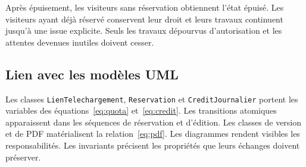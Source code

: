 Après épuisement, les visiteurs sans réservation obtiennent l'état épuisé. Les visiteurs ayant déjà réservé conservent leur droit et leurs travaux continuent jusqu'à une issue explicite. Seuls les travaux dépourvus d'autorisation et les attentes devenues inutiles doivent cesser.

\subsection{Lien avec les modèles UML}
Les classes \texttt{LienTelechargement}, \texttt{Reservation} et \texttt{CreditJournalier} portent les variables des équations~\eqref{eq:quota} et~\eqref{eq:credit}. Les transitions atomiques apparaissent dans les séquences de réservation et d'édition. Les classes de version et de PDF matérialisent la relation~\eqref{eq:pdf}. Les diagrammes rendent visibles les responsabilités. Les invariants précisent les propriétés que leurs échanges doivent préserver.
